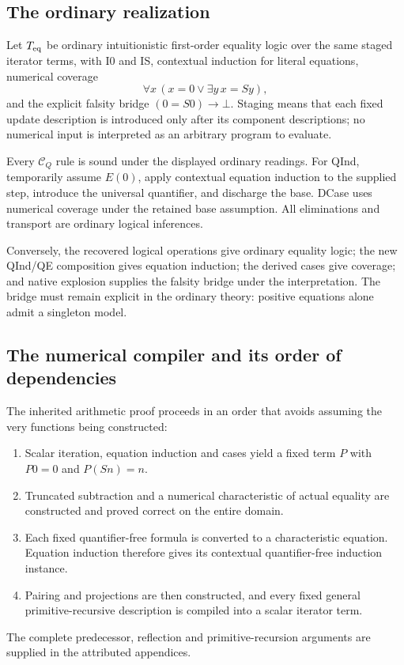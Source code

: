 \documentclass[11pt,letterpaper]{article}
\theoremstyle{definition}\newtheorem{definition}[theorem]{Definition}
\theoremstyle{remark}\newtheorem{remark}[theorem]{Remark}
\newcommand{\CQ}{\mathcal C_Q}
\begin{document}
\subsection{The ordinary realization}

Let $T_{\rm eq}$ be ordinary intuitionistic first-order equality logic
over the same staged iterator terms, with I0 and IS, contextual induction
for literal equations, numerical coverage
\[
                \forall x\,(x=0\vee\exists y\,x=Sy),
\]
and the explicit falsity bridge $(0=S0)\to\bot$.
Staging means that each fixed update description is introduced only after
its component descriptions; no numerical input is interpreted as an
arbitrary program to evaluate.

Every $\CQ$ rule is sound under the displayed ordinary readings.
For QInd, temporarily assume $E(0)$, apply contextual equation induction
to the supplied step, introduce the universal quantifier, and discharge
the base. DCase uses numerical coverage under the retained base assumption.
All eliminations and transport are ordinary logical inferences.

Conversely, the recovered logical operations give ordinary equality
logic; the new QInd/QE composition gives equation induction; the
derived cases give coverage; and native explosion supplies the falsity
bridge under the interpretation. The bridge must remain explicit in
the ordinary theory: positive equations alone admit a singleton model.

\subsection{The numerical compiler and its order of dependencies}

The inherited arithmetic proof proceeds in an order that avoids assuming
the very functions being constructed:
\begin{enumerate}
\item Scalar iteration, equation induction and cases yield a fixed term
      $P$ with $P0=0$ and $P(Sn)=n$.
\item Truncated subtraction and a numerical characteristic of actual
      equality are constructed and proved correct on the entire domain.
\item Each fixed quantifier-free formula is converted to a characteristic
      equation. Equation induction therefore gives its contextual
      quantifier-free induction instance.
\item Pairing and projections are then constructed, and every fixed
      general primitive-recursive description is compiled into a scalar
      iterator term.
\end{enumerate}
The complete predecessor, reflection and primitive-recursion arguments
are supplied in the attributed appendices.
\end{document}
